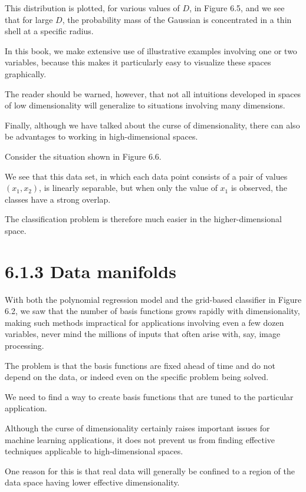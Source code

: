 \documentclass{article}
\begin{document}
This distribution is plotted, for various values of $D$, in Figure 6.5, and we see that for large $D$, the probability mass of the Gaussian is concentrated in a thin shell at a specific radius.

In this book, we make extensive use of illustrative examples involving one or two variables, because this makes it particularly easy to visualize these spaces graphically. 

The reader should be warned, however, that not all intuitions developed in spaces of low dimensionality will generalize to situations involving many dimensions.

Finally, although we have talked about the curse of dimensionality, there can also be advantages to working in high-dimensional spaces. 

Consider the situation shown in Figure 6.6. 

We see that this data set, in which each data point consists of a pair of values $(x_1, x_2)$, is linearly separable, but when only the value of $x_1$ is observed, the classes have a strong overlap. 

The classification problem is therefore much easier in the higher-dimensional space.

\section{6.1.3 Data manifolds}

With both the polynomial regression model and the grid-based classifier in Figure 6.2, we saw that the number of basis functions grows rapidly with dimensionality, making such methods impractical for applications involving even a few dozen variables, never mind the millions of inputs that often arise with, say, image processing. 

The problem is that the basis functions are fixed ahead of time and do not depend on the data, or indeed even on the specific problem being solved. 

We need to find a way to create basis functions that are tuned to the particular application.

Although the curse of dimensionality certainly raises important issues for machine learning applications, it does not prevent us from finding effective techniques applicable to high-dimensional spaces. 

One reason for this is that real data will generally be confined to a region of the data space having lower effective dimensionality. 
\end{document}
